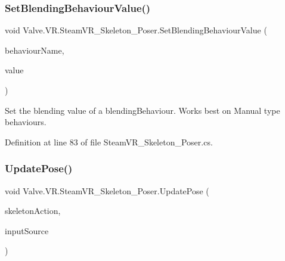 \mbox{\label{class_valve_1_1_v_r_1_1_steam_v_r___skeleton___poser_aa78aff2ee1050b6b9d1e75fcdba716de}} 
\subsubsection{\texorpdfstring{SetBlendingBehaviourValue()}{SetBlendingBehaviourValue()}}
{\footnotesize\ttfamily void Valve.\+V\+R.\+Steam\+V\+R\+\_\+\+Skeleton\+\_\+\+Poser.\+Set\+Blending\+Behaviour\+Value (\begin{DoxyParamCaption}\item[{string}]{behaviour\+Name,  }\item[{float}]{value }\end{DoxyParamCaption})}



Set the blending value of a blending\+Behaviour. Works best on Manual type behaviours. 



Definition at line 83 of file Steam\+V\+R\+\_\+\+Skeleton\+\_\+\+Poser.\+cs.

\mbox{\label{class_valve_1_1_v_r_1_1_steam_v_r___skeleton___poser_a02450c90d63ca61606ef052ecf07785b}} 
\subsubsection{\texorpdfstring{UpdatePose()}{UpdatePose()}}
{\footnotesize\ttfamily void Valve.\+V\+R.\+Steam\+V\+R\+\_\+\+Skeleton\+\_\+\+Poser.\+Update\+Pose (\begin{DoxyParamCaption}\item[{\mbox{\hyperlink{class_valve_1_1_v_r_1_1_steam_v_r___action___skeleton}{Steam\+V\+R\+\_\+\+Action\+\_\+\+Skeleton}}}]{skeleton\+Action,  }\item[{\mbox{\hyperlink{namespace_valve_1_1_v_r_a82e5bf501cc3aa155444ee3f0662853f}{Steam\+V\+R\+\_\+\+Input\+\_\+\+Sources}}}]{input\+Source }\end{DoxyParamCaption})}



